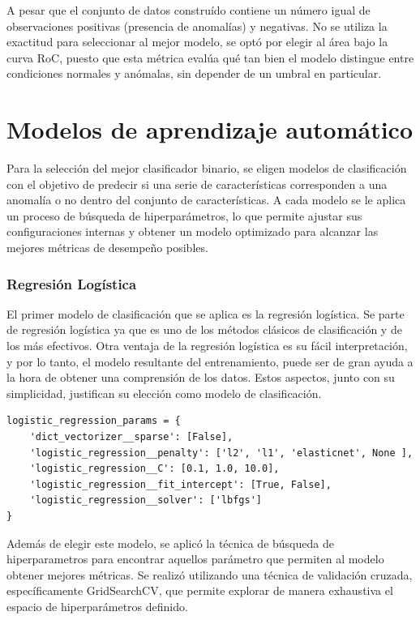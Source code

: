 \documentclass[11pt,a4paper,spanish]{book}
\numberwithin{equation}{chapter}
\numberwithin{figure}{chapter}
\begin{document}
A pesar que el conjunto de datos construído contiene un número igual de observaciones 
positivas (presencia de anomalías) y negativas. No se utiliza la exactitud para 
seleccionar al mejor modelo, se optó por elegir al área bajo la curva RoC, puesto que 
esta métrica evalúa qué tan bien el modelo distingue entre condiciones normales y 
anómalas, sin depender de un umbral en particular. 


\section{Modelos de aprendizaje automático}

Para la selección del mejor clasificador binario, se eligen modelos de clasificación 
con el objetivo de predecir si una serie de características corresponden a una anomalía 
o no dentro del conjunto de características. A cada modelo se le aplica un proceso de 
búsqueda de hiperparámetros, lo que permite ajustar sus configuraciones internas y 
obtener un modelo optimizado para alcanzar las mejores métricas de desempeño posibles. 


\subsubsection{Regresión Logística}

El primer modelo de clasificación que se aplica es la regresión logística. Se parte de  
regresión logística ya que es uno de los métodos clásicos de clasificación y de los  más 
efectivos. Otra ventaja de la regresión logística es su fácil interpretación, y por lo 
tanto, el modelo resultante del entrenamiento, puede ser de gran ayuda a la hora de 
obtener una comprensión de los datos. Estos aspectos, junto con su simplicidad, 
justifican su elección como modelo de clasificación.


\vspace{5mm}
\begin{lstlisting}
logistic_regression_params = {
    'dict_vectorizer__sparse': [False],
    'logistic_regression__penalty': ['l2', 'l1', 'elasticnet', None ],
    'logistic_regression__C': [0.1, 1.0, 10.0],
    'logistic_regression__fit_intercept': [True, False],
    'logistic_regression__solver': ['lbfgs']
}
\end{lstlisting}


Además de elegir este modelo, se aplicó la técnica de búsqueda de hiperparametros para 
encontrar aquellos parámetro que permiten al modelo obtener mejores métricas. Se realizó 
utilizando una técnica de validación cruzada, específicamente GridSearchCV, que permite 
explorar de manera exhaustiva el espacio de hiperparámetros definido.
\end{document}
